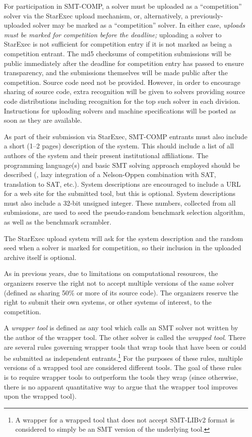 \documentclass[12pt]{article}
\begin{document}
For participation in SMT-COMP, a solver must be
uploaded as a ``competition'' solver via the StarExec upload
mechanism, or, alternatively, a previously-uploaded solver may be
marked as a ``competition'' solver.  In either case, \emph{uploads
must be marked for competition before the deadline;} uploading a solver
to StarExec is not sufficient for competition entry if it is not marked
as being a competition entrant.  The md5 checksums of competition
submissions will be public immediately after the deadline for competition
entry has passed to ensure transparency, and the submissions themselves
will be made public after the competition.  Source code need not be
provided.  However, in order to encourage sharing of source code, extra
recognition will be given to solvers providing source code distributions
including recognition for the top such solver in each division.  Instructions
for uploading solvers and machine specifications will be posted as soon
as they are available.

As part of their submission via StarExec,
SMT-COMP entrants must also include a short (1--2 pages) description of
the system.  This should include a list of all authors of the system
and their present institutional affiliations.  The programming
language(s) and basic SMT solving approach employed should be
described (\eg, lazy integration of a Nelson-Oppen combination with
SAT, translation to SAT, etc.).  System descriptions are encouraged to
include a URL for a web site for the submitted tool, but this is
optional.  System descriptions must also include a 32-bit unsigned
integer.  These numbers, collected from all submissions, are used
to seed the pseudo-random benchmark selection algorithm, as well
as the benchmark scrambler.

The StarExec upload system will ask for the system description and
the random seed when a solver is marked for competition, so
their inclusion in the uploaded archive itself is optional.

As in previous years, due to limitations on
computational resources, the organizers reserve the right not to
accept multiple versions of the same solver (defined as sharing 50\%
or more of its source code).  The organizers reserve the right to
submit their own systems, or other systems of interest, to the
competition.

A \emph{wrapper tool} is defined as any tool
which calls an SMT solver not written by the author of the wrapper
tool.  The other solver is called the \emph{wrapped tool}.  There are
several rules governing wrapper tools that wrap tools that have been or could be submitted as independent entrants.\footnote{A wrapper
for a wrapped tool that does not accept SMT-LIBv2 format is considered to simply be an SMT version of the underlying tool.}
For the purposes of these rules,
multiple versions of a wrapped tool are considered different tools.
The goal of these rules is to require wrapper tools to outperform the
tools they wrap (since otherwise, there is no apparent quantitative
way to argue that the wrapper tool improves upon the wrapped tool).
\end{document}

